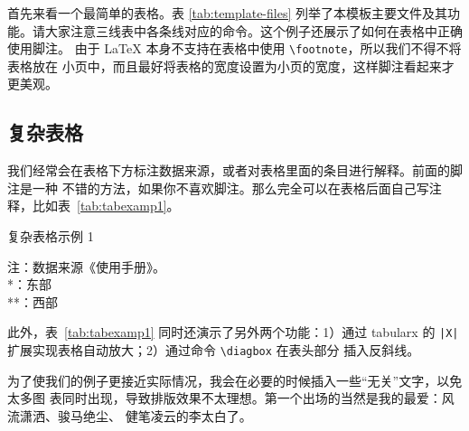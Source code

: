 首先来看一个最简单的表格。表 \ref{tab:template-files} 列举了本模板主要文件及其功
能。请大家注意三线表中各条线对应的命令。这个例子还展示了如何在表格中正确使用脚注。
由于 \LaTeX{} 本身不支持在表格中使用 \verb|\footnote|，所以我们不得不将表格放在
小页中，而且最好将表格的宽度设置为小页的宽度，这样脚注看起来才更美观。

\subsection{复杂表格}
\label{sec:complicatedtable}

我们经常会在表格下方标注数据来源，或者对表格里面的条目进行解释。前面的脚注是一种
不错的方法，如果你不喜欢脚注。那么完全可以在表格后面自己写注释，比如表~\ref{tab:tabexamp1}。
\begin{table}[htbp]
  \centering
  \caption{复杂表格示例 1}
  \label{tab:tabexamp1}
  \begin{minipage}[t]{0.8\textwidth} 
    \footnotesize 注：数据来源《使用手册》。\\
    *：东部\\
    **：西部
  \end{minipage}
\end{table}

此外，表~\ref{tab:tabexamp1} 同时还演示了另外两个功能：1）通过 \textsf{tabularx} 的
 \texttt{|X|} 扩展实现表格自动放大；2）通过命令 \verb|\diagbox| 在表头部分
插入反斜线。

为了使我们的例子更接近实际情况，我会在必要的时候插入一些“无关”文字，以免太多图
表同时出现，导致排版效果不太理想。第一个出场的当然是我的最爱：风流潇洒、骏马绝尘、
健笔凌云的{\heiti 李太白}了。

